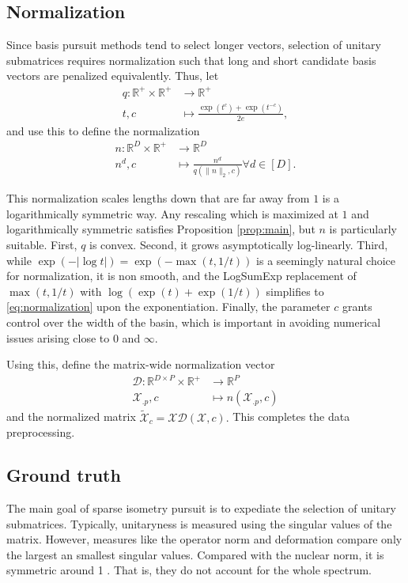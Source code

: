 \documentclass[a4paper,11pt]{article}
\begin{document}
\subsection{Normalization}

Since basis pursuit methods tend to select longer vectors, selection of unitary submatrices requires normalization such that long and short candidate basis vectors are penalized equivalently.
Thus, let
\begin{align}
\label{eq:normalization}
q: \mathbb R^+ \times \mathbb R^+  &\to \mathbb R^+ \\
t , c &\mapsto \frac{\exp(t^c) + \exp(t^{-c})}{2e},
\end{align}
and use this to define the normalization 
\begin{align}
n: \mathbb R^D \times \mathbb R^+ &\to \mathbb R^D \\
n^d , c &\mapsto \frac{n^d}{q(\|n\|_{2},c) } \forall d \in [D].
\end{align}

This normalization scales lengths down that are far away from $1$ is a logarithmically symmetric way.
Any rescaling which is maximized at $1$ and logarithmically symmetric satisfies Proposition \ref{prop:main}, but $n$ is particularly suitable.
First, $q$ is convex.
Second, it grows asymptotically log-linearly.
Third, while $\exp(-|\log t|) = \exp(-\max (t, 1/t))$ is a seemingly natural choice for normalization, it is non smooth, and the LogSumExp replacement of $\max (t, 1/t)$ with $ \log (\exp (t ) + \exp(1/t))$ simplifies to \ref{eq:normalization} upon the exponentiation.
Finally, the parameter $c$ grants control over the width of the basin, which is important in avoiding numerical issues arising close to $0$ and $\infty$.

Using this, define the matrix-wide normalization vector
\begin{align}
\mathcal D: \mathbb R^{D \times P} \times \mathbb R^+ &\to \mathbb R^P \\
\mathcal X_{.p}, c &\mapsto n(\mathcal X_{.p}, c)
\end{align}
and the normalized matrix $\tilde {\mathcal X}_c = \mathcal X \mathcal D(\mathcal X, c).$
This completes the data preprocessing.

\subsection{Ground truth}

The main goal of sparse isometry pursuit is to expediate the selection of unitary submatrices.
Typically, unitaryness is measured using the singular values of the matrix.
However, measures like the operator norm and deformation compare only the largest an smallest singular values.
Compared with the nuclear norm, it is symmetric around 1 \cite{Fazel2001ARM}. %
That is, they do not account for the whole spectrum.
\end{document}
